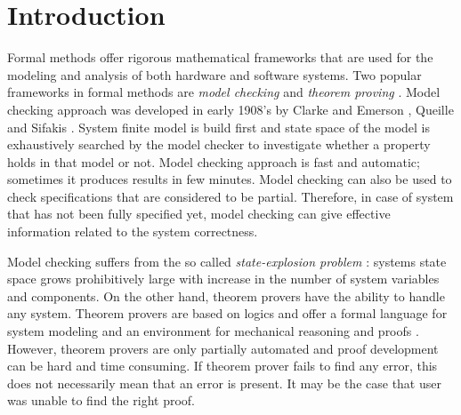 \documentclass[conference]{IEEEtran}
\begin{document}
\section{Introduction}
Formal methods offer rigorous mathematical frameworks that are used for the modeling and analysis of both hardware and software systems. Two popular 
frameworks in formal methods are \textit{model checking} and \textit{theorem proving} \cite{1}. Model checking approach was developed in early 1908’s 
by Clarke and Emerson \cite{2}, Queille and Sifakis \cite{3}. System finite model is build first and state space of the model is exhaustively searched 
by the model checker to investigate whether a property holds in that model or not. Model checking approach is fast and automatic; sometimes it 
produces results in few minutes. Model checking can also be used to check specifications that are considered to be partial. Therefore, in case of 
system that has not been fully specified yet, model checking can give effective information related to the system correctness. 

Model checking suffers from the so called \textit{state-explosion problem} \cite{6}: systems state space grows prohibitively large with increase in 
the number of system variables and components. On the other hand, theorem provers have the ability to handle any system. Theorem provers are based 
on logics and offer a formal language for system modeling and an environment for mechanical reasoning and proofs \cite{5}. However, theorem provers 
are only partially automated and proof development can be hard and time consuming. If theorem prover fails to find any error, this does not 
necessarily mean that an error is present. It may be the case that user was unable to find the right proof. 
\end{document}
